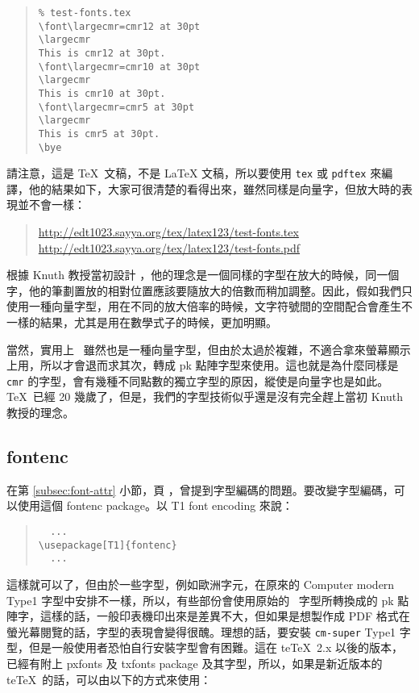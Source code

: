 \begin{quote}
  \begin{verbatim}
% test-fonts.tex
\font\largecmr=cmr12 at 30pt
\largecmr
This is cmr12 at 30pt.
\font\largecmr=cmr10 at 30pt
\largecmr
This is cmr10 at 30pt.
\font\largecmr=cmr5 at 30pt
\largecmr
This is cmr5 at 30pt.
\bye
\end{verbatim}
\end{quote}

請注意，這是 \TeX\ 文稿，不是 \LaTeX{} 文稿，所以要使用 \texttt{tex} 或 \texttt{pdftex} 來編譯，他的結果如下，大家可很清楚的看得出來，雖然同樣是向量字，但放大時的表現並不會一樣：

\begin{quote}
  \url{http://edt1023.sayya.org/tex/latex123/test-fonts.tex}\\
  \url{http://edt1023.sayya.org/tex/latex123/test-fonts.pdf}
\end{quote}

根據 Knuth 教授當初設計 \MF{}，他的理念是一個同樣的字型在放大的時候，同一個字，他的筆劃置放的相對位置應該要隨放大的倍數而稍加調整。因此，假如我們只使用一種向量字型，用在不同的放大倍率的時候，文字符號間的空間配合會產生不一樣的結果，尤其是用在數學式子的時候，更加明顯。

當然，實用上 \MF\ 雖然也是一種向量字型，但由於太過於複雜，不適合拿來螢幕顯示上用，所以才會退而求其次，轉成 pk 點陣字型來使用。這也就是為什麼同樣是 \texttt{cmr} 的字型，會有幾種不同點數的獨立字型的原因，縱使是向量字也是如此。\TeX\ 已經 20 幾歲了，但是，我們的字型技術似乎還是沒有完全趕上當初 Knuth 教授的理念。

\subsection{fontenc}

在第 \ref{subsec:font-attr} 小節，頁 \pageref{subsec:font-attr}，曾提到字型編碼的問題。要改變字型編碼，可以使用這個 \textsf{fontenc} package。以 T1 font encoding 來說：

\begin{quote}
  \begin{verbatim}
  ...
\usepackage[T1]{fontenc}
  ...
\end{verbatim}
\end{quote}

這樣就可以了，但由於一些字型，例如歐洲字元，在原來的 Computer modern Type1 字型中安排不一樣，所以，有些部份會使用原始的 \MF\ 字型所轉換成的 pk 點陣字，這樣的話，一般印表機印出來是差異不大，但如果是想製作成 PDF 格式在螢光幕閱覽的話，字型的表現會變得很醜。理想的話，要安裝 \texttt{cm-super} Type1 字型，但是一般使用者恐怕自行安裝字型會有困難。這在 te\TeX\ 2.x 以後的版本，已經有附上 \textsf{pxfonts} 及 \textsf{txfonts} package 及其字型，所以，如果是新近版本的 te\TeX\ 的話，可以由以下的方式來使用：

